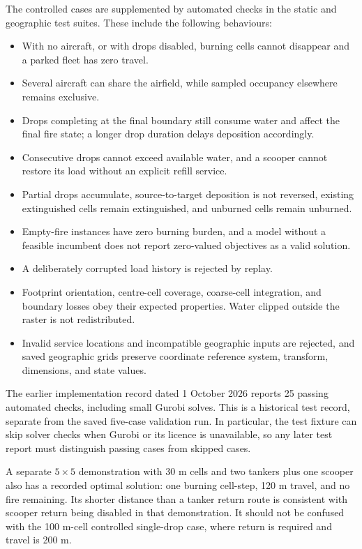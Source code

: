 The controlled cases are supplemented by automated checks in the static and geographic test suites. These include the following behaviours:
\begin{itemize}
    \item With no aircraft, or with drops disabled, burning cells cannot disappear and a parked fleet has zero travel.
    \item Several aircraft can share the airfield, while sampled occupancy elsewhere remains exclusive.
    \item Drops completing at the final boundary still consume water and affect the final fire state; a longer drop duration delays deposition accordingly.
    \item Consecutive drops cannot exceed available water, and a scooper cannot restore its load without an explicit refill service.
    \item Partial drops accumulate, source-to-target deposition is not reversed, existing extinguished cells remain extinguished, and unburned cells remain unburned.
    \item Empty-fire instances have zero burning burden, and a model without a feasible incumbent does not report zero-valued objectives as a valid solution.
    \item A deliberately corrupted load history is rejected by replay.
    \item Footprint orientation, centre-cell coverage, coarse-cell integration, and boundary losses obey their expected properties. Water clipped outside the raster is not redistributed.
    \item Invalid service locations and incompatible geographic inputs are rejected, and saved geographic grids preserve coordinate reference system, transform, dimensions, and state values.
\end{itemize}
The earlier implementation record dated 1 October 2026 reports 25 passing automated checks, including small Gurobi solves. This is a historical test record, separate from the saved five-case validation run. In particular, the test fixture can skip solver checks when Gurobi or its licence is unavailable, so any later test report must distinguish passing cases from skipped cases.

A separate $5\times5$ demonstration with 30 m cells and two tankers plus one scooper also has a recorded optimal solution: one burning cell-step, 120 m travel, and no fire remaining. Its shorter distance than a tanker return route is consistent with scooper return being disabled in that demonstration. It should not be confused with the 100 m-cell controlled single-drop case, where return is required and travel is 200 m.

